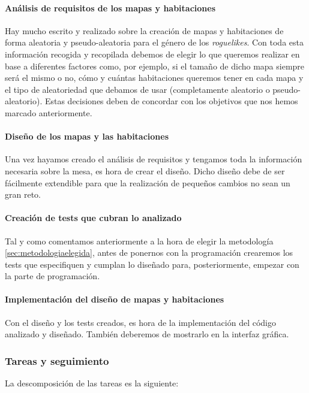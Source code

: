 \paragraph{Análisis de requisitos de los mapas y habitaciones} Hay mucho escrito y realizado sobre la creación de mapas y habitaciones de forma aleatoria y pseudo-aleatoria para el género de los \textit{roguelikes}. Con toda esta información recogida y recopilada debemos de elegir lo que queremos realizar en base a diferentes factores como, por ejemplo, si el tamaño de dicho mapa siempre será el mismo o no, cómo y cuántas habitaciones queremos tener en cada mapa y el tipo de aleatoriedad que debamos de usar (completamente aleatorio o pseudo-aleatorio). Estas decisiones deben de concordar con los objetivos que nos hemos marcado anteriormente.

\paragraph{Diseño de los mapas y las habitaciones} Una vez hayamos creado el análisis de requisitos y tengamos toda la información necesaria sobre la mesa, es hora de crear el diseño. Dicho diseño debe de ser fácilmente extendible para que la realización de pequeños cambios no sean un gran reto.

\paragraph{Creación de tests que cubran lo analizado} Tal y como comentamos anteriormente a la hora de elegir la metodología \ref{sec:metodologiaelegida}, antes de ponernos con la programación crearemos los tests que especifiquen y cumplan lo diseñado para, posteriormente, empezar con la parte de programación.

\paragraph{Implementación del diseño de mapas y habitaciones} Con el diseño y los tests creados, es hora de la implementación del código analizado y diseñado. También deberemos de mostrarlo en la interfaz gráfica.

\subsubsection{Tareas y seguimiento}

La descomposición de las tareas es la siguiente:

